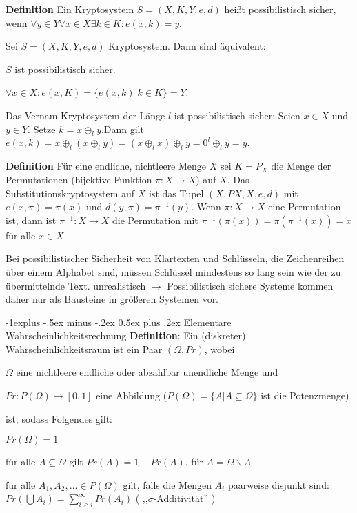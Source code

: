 \documentclass[a4paper]{article}
\makeatletter
\renewcommand{\subsection}{\@startsection{subsection}{2}{0mm}%
 {-1explus -.5ex minus -.2ex}%
 {0.5ex plus .2ex}%
 {\normalfont\normalsize\bfseries}}
\makeatother
\begin{document}
\begin{multicols}{3}
    \textbf{Definition} Ein Kryptosystem $S=(X,K,Y,e,d)$ heißt possibilistisch sicher, wenn $\forall y\in Y\forall x\in X\exists k\in K:e(x,k)=y$.

    \begin{enumerate*}
        \item Sei $S=(X,K,Y,e,d)$ Kryptosystem. Dann sind äquivalent:
        \begin{itemize*}
            \item $S$ ist possibilistisch sicher.
            \item $\forall x\in X:e(x,K)=\{e(x,k)|k\in K\}=Y$.
        \end{itemize*}
        \item Das Vernam-Kryptosystem der Länge $l$ ist possibilistisch sicher: Seien $x\in X$ und $y\in Y$. Setze $k=x\oplus_l y$.Dann gilt $e(x,k)=x\oplus_l(x\oplus_l y)=(x\oplus_l x)\oplus_l y= 0^l\oplus_l y=y$.
    \end{enumerate*}

    \textbf{Definition} Für eine endliche, nichtleere Menge $X$ sei $K=P_X$ die Menge der Permutationen (bijektive Funktion $\pi:X\rightarrow X$) auf $X$. Das Substitutionskryptosystem auf $X$ ist das Tupel $(X,PX,X,e,d)$ mit $e(x,\pi)=\pi(x)$ und $d(y,\pi)=\pi^{-1} (y)$.
    Wenn $\pi:X\rightarrow X$ eine Permutation ist, dann ist $\pi^{-1}:X\rightarrow X$ die Permutation mit $\pi^{-1}(\pi(x))=\pi(\pi^{-1}(x)) =x$ für alle $x\in X$.

    Bei possibilistischer Sicherheit von Klartexten und Schlüsseln, die Zeichenreihen über einem Alphabet sind, müssen Schlüssel mindestens so lang sein wie der zu übermittelnde Text. unrealistisch $\rightarrow$ Possibilistisch sichere Systeme kommen daher nur als Bausteine in größeren Systemen vor.

    \subsection{Elementare Wahrscheinlichkeitsrechnung}
    \textbf{Definition}: Ein (diskreter) Wahrscheinlichkeitsraum ist ein Paar $(\Omega,Pr)$, wobei
    \begin{itemize*}
        \item $\Omega$ eine nichtleere endliche oder abzählbar unendliche Menge und
        \item $Pr:P(\Omega)\rightarrow[0,1]$ eine Abbildung ($P(\Omega)=\{A|A\subseteq\Omega\}$ ist die Potenzmenge)
    \end{itemize*}
    ist, sodass Folgendes gilt:
    \begin{enumerate*}
        \item $Pr(\Omega) = 1$
        \item für alle $A\subseteq\Omega$ gilt $Pr(A)=1-Pr(A)$, für $A=\Omega\backslash A$
        \item für alle $A_1,A_2,...\in P(\Omega)$ gilt, falls die Mengen $A_i$ paarweise disjunkt sind: $Pr(\bigcup A_i)=\sum_{i\geq i}^{\infty} Pr(A_i)$ ( ,,$\sigma$-Additivität'' )
    \end{enumerate*}


\end{multicols}
\end{document}
